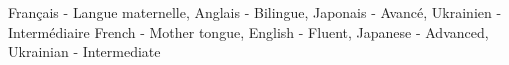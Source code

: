 \vspace{\ItemsSpacing}

\ifnativelang
{}
{Fran\c cais - \textmd{Langue maternelle,} Anglais - \textmd{Bilingue,} Japonais - \textmd{Avanc\'e,} Ukrainien - \textmd{Interm\'ediaire}}{}{}{}{}
\else
{}
{French - \textmd{Mother tongue,} English - \textmd{Fluent,} Japanese - \textmd{Advanced,} Ukrainian - \textmd{Intermediate}}{}{}{}{}
\fi









